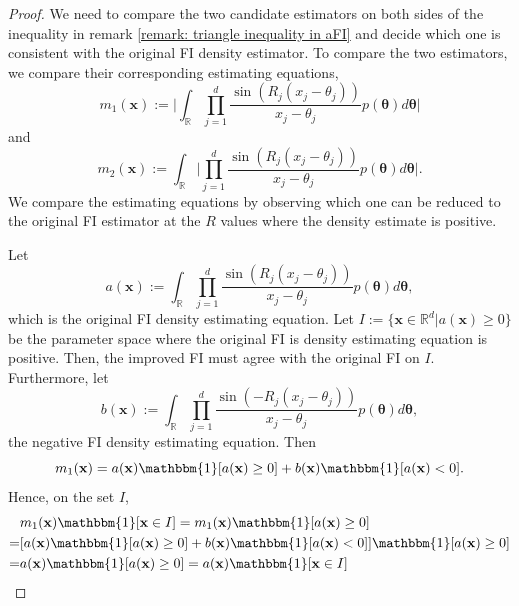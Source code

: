 \documentclass[%
 reprint,
 amsmath,amssymb,
 aps,
]{revtex4-2}
\def\R{\mathbb{R}}
\def\btheta{\boldsymbol{\theta}}
\def\btheta{\boldsymbol{\theta}}
\def\xbold{\mathbf{x}}
\newcommand{\btheta}{\mbox{\boldmath $\theta$}}
\begin{document}
\begin{proof}
    We need to compare the two candidate estimators on both sides of the inequality in remark \ref{remark: triangle inequality in aFI} and decide which one is consistent with the original FI density estimator. To compare the two estimators, we compare their corresponding estimating equations,
    \begin{equation*}
         m_1(\xbold) := \bigg|\int_\R \prod_{j = 1}^d \frac{\sin(R_j(x_j - \theta_j))}{x_j - \theta_j} p(\btheta)d\btheta\bigg|
    \end{equation*}
    and
    \begin{equation*}
        m_2(\xbold) := \int_\R \bigg|\prod_{j = 1}^d \frac{\sin(R_j(x_j - \theta_j))}{x_j - \theta_j} p(\btheta)d\btheta\bigg|.
    \end{equation*}
    We compare the estimating equations by observing which one can be reduced to the original FI estimator at the $R$ values where the density estimate is positive.

    Let
    \begin{equation*}
        a(\xbold) := \int_\R \prod_{j = 1}^d \frac{\sin(R_j(x_j - \theta_j))}{x_j - \theta_j} p(\btheta)d\btheta,
    \end{equation*}
    which is the original FI density estimating equation. Let $I := \{\xbold \in \R^d | a(\xbold) \ge 0\}$ be the parameter space where the original FI is density estimating equation is positive. Then, the improved FI must agree with the original FI on $I$. Furthermore, let
    \begin{equation*}
        b(\xbold) := \int_\R \prod_{j = 1}^d \frac{\sin(-R_j(x_j - \theta_j))}{x_j - \theta_j} p(\btheta)d\btheta,
    \end{equation*}
    the negative FI density estimating equation. Then
    \begin{equation*}
        m_1(\xbold) = a(\xbold)\mathbbm{1}[a(\xbold) \ge 0] + b(\xbold) \mathbbm{1}[a(\xbold) < 0].
    \end{equation*}
    Hence, on the set $I$, 
    \begin{align*}
        & m_1(\xbold)\mathbbm{1}[\xbold \in I] = m_1(\xbold)\mathbbm{1}[a(\xbold) \ge 0] \\
        = & [a(\xbold)\mathbbm{1}[a(\xbold) \ge 0] + b(\xbold) \mathbbm{1}[a(\xbold) < 0]]\mathbbm{1}[a(\xbold) \ge 0] \\
        = & a(\xbold)\mathbbm{1}[a(\xbold) \ge 0] = a(\xbold)\mathbbm{1}[\xbold \in I]
    \end{align*}


\end{proof}
\end{document}
